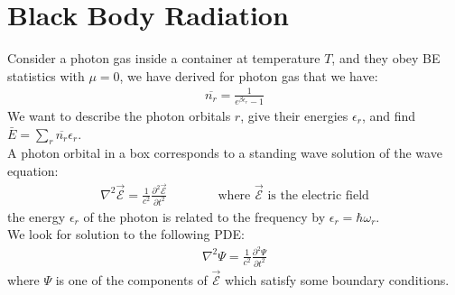 \documentclass[11pt,oneside]{book}
\theoremstyle{break}
\theoremstyle{break}
\begin{document}
\newpage
\section[Black Body Radiation]{\color{red} Black Body Radiation\color{black}}
Consider a photon gas inside a container at temperature $T$, and they obey BE statistics with $\mu = 0$, we have derived for photon gas that we have:
\begin{align*}
\overline{n_r} = \frac{1}{e^{\beta \epsilon_r} - 1}
\end{align*}
We want to describe the photon orbitals $r$, give their energies $\epsilon_r$, and find $\bar{E} = \sum_r \overline{n_r} \epsilon_r$. \\

A photon orbital in a box corresponds to a standing wave solution of the wave equation:
\begin{align*}
\nabla^2 \vec{\mathcal{E}} = \frac{1}{c^2}\frac{\partial^2 \vec{\mathcal{E}}}{\partial t^2} \qquad \qquad \text{where }\vec{\mathcal{E}} \text{ is the electric field}
\end{align*}
the energy $\epsilon_r$ of the photon is related to the frequency by $\epsilon_r = \hbar \omega_r$. \\

We look for solution to the following PDE:
\begin{align*}
\nabla^2 \Psi = \frac{1}{c^2}\frac{\partial^2 \Psi}{\partial t^2}  \tag{PSI}
\end{align*}
where $\Psi$ is one of the components of $\vec{\mathcal{E}}$ which satisfy some boundary conditions.\\
\end{document}
